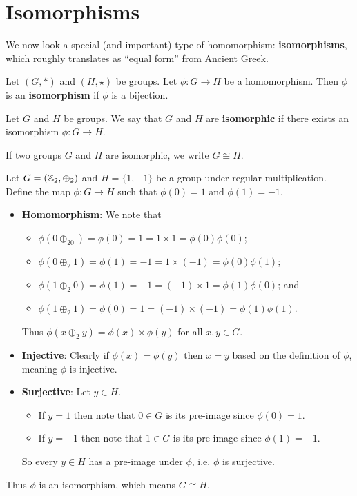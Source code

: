 \section{Isomorphisms}
We now look a special (and important) type of homomorphism: \textbf{isomorphisms}, which roughly translates as ``equal form'' from Ancient Greek.

\begin{definition}
    Let $(G, \ast)$ and $(H, \star)$ be groups. Let $\phi: G \to H$ be a homomorphism. Then $\phi$ is an \textbf{isomorphism} if $\phi$ is a bijection.
\end{definition}
\begin{definition}
    Let $G$ and $H$ be groups. We say that $G$ and $H$ are \textbf{isomorphic} if there exists an isomorphism $\phi: G \to H$.

    If two groups $G$ and $H$ are isomorphic, we write $G \cong H$.
\end{definition}

\begin{example}
    Let $G = (\mathbb{Z}_2, \oplus_2)$ and $H = \{1, -1\}$ be a group under regular multiplication. Define the map $\phi: G \to H$ such that $\phi(0) = 1$ and $\phi(1) = -1$.

    \begin{itemize}
        \item \textbf{Homomorphism}: We note that
        \begin{itemize}
            \item $\phi(0\oplus_20) = \phi(0) = 1 = 1 \times 1 = \phi(0)\phi(0)$;
            \item $\phi(0 \oplus_2 1) = \phi(1) = -1 = 1 \times (-1) = \phi(0)\phi(1)$;
            \item $\phi(1 \oplus_2 0) = \phi(1) = -1 = (-1) \times 1 = \phi(1)\phi(0)$; and
            \item $\phi(1 \oplus_2 1) = \phi(0) = 1 = (-1) \times (-1) = \phi(1)\phi(1)$.
        \end{itemize}
        Thus $\phi(x\oplus_2y) = \phi(x)\times\phi(y)$ for all $x, y \in G$.

        \item \textbf{Injective}: Clearly if $\phi(x) = \phi(y)$ then $x = y$ based on the definition of $\phi$, meaning $\phi$ is injective.

        \item \textbf{Surjective}: Let $y \in H$.
        \begin{itemize}
            \item If $y = 1$ then note that $0 \in G$ is its pre-image since $\phi(0) = 1$.
            \item If $y = -1$ then note that $1 \in G$ is its pre-image since $\phi(1) = -1$.
        \end{itemize}
        So every $y \in H$ has a pre-image under $\phi$, i.e. $\phi$ is surjective.
    \end{itemize}
    Thus $\phi$ is an isomorphism, which means $G \cong H$.
\end{example}

